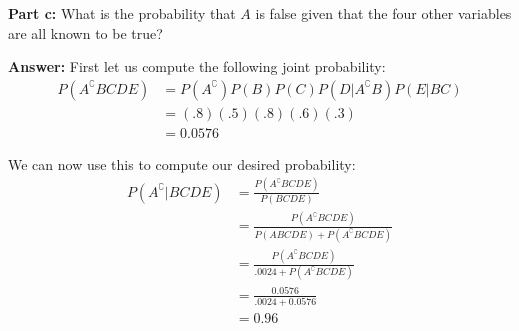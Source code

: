 \documentclass{article}
\begin{document}
\noindent\textbf{Part c:} What is the probability that $A$ is false given that the four other variables are all known to be true?
\smallskip

\noindent\textbf{Answer:} First let us compute the following joint probability:
\begin{align*}
  P(A^\complement BCDE)&=P(A^\complement)P(B)P(C)P(D|A^\complement B)P(E|BC)\\
  &=(.8)(.5)(.8)(.6)(.3)\\
  &=0.0576
\end{align*}

We can now use this to compute our desired probability:
\begin{align*}
  P(A^\complement|BCDE)&=\frac{P(A^\complement BCDE)}{P(BCDE)}\tag{Bayes' Theorem}\\
  &=\frac{P(A^\complement BCDE)}{P(ABCDE)+P(A^\complement BCDE)}\tag{law of total probability}\\
  &=\frac{P(A^\complement BCDE)}{.0024+P(A^\complement BCDE)}\tag{part a}\\
  &=\frac{0.0576}{.0024+0.0576}\tag{above calculation}\\
  &= 0.96
\end{align*}
\end{document}

